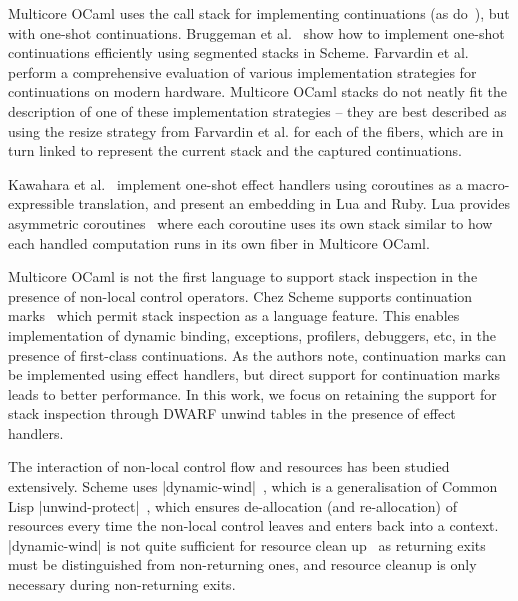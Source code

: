 \documentclass[sigplan,10pt,review,anonymous]{acmart}\settopmatter{printfolios=true,printccs=false,printacmref=false}
\begin{document}
Multicore OCaml uses the call stack for implementing continuations (as
do~\cite{Leijen14, Kiselyov12}), but with one-shot continuations. Bruggeman et
al.~\cite{Bruggeman96} show how to implement one-shot continuations efficiently
using segmented stacks in Scheme. Farvardin et al.~\cite{Farvardin20} perform a
comprehensive evaluation of various implementation strategies for continuations
on modern hardware. Multicore OCaml stacks do not neatly fit the description of
one of these implementation strategies -- they are best described as using the
resize strategy from Farvardin et al. for each of the fibers, which are in turn
linked to represent the current stack and the captured continuations.

Kawahara et al.~\cite{Kawahara20} implement one-shot effect handlers using
coroutines as a macro-expressible translation, and present an embedding in Lua
and Ruby. Lua provides asymmetric coroutines~\cite{Lua} where each coroutine
uses its own stack similar to how each handled computation runs in its own
fiber in Multicore OCaml.

Multicore OCaml is not the first language to support stack inspection in the
presence of non-local control operators. Chez Scheme supports continuation
marks~\cite{Flatt20} which permit stack inspection as a language feature. This
enables implementation of dynamic binding, exceptions, profilers, debuggers,
etc, in the presence of first-class continuations. As the authors note,
continuation marks can be implemented using effect handlers, but direct support
for continuation marks leads to better performance. In this work, we focus on
retaining the support for stack inspection through DWARF unwind tables in the
presence of effect handlers.

The interaction of non-local control flow and resources has been studied
extensively. Scheme uses |dynamic-wind|~\cite{R5RS}, which is a generalisation of
Common Lisp |unwind-protect|~\cite{Steele90}, which ensures de-allocation (and
re-allocation) of resources every time the non-local control leaves and enters
back into a context. |dynamic-wind| is not quite sufficient for resource
clean up~\cite{Kiselyov,Sitaram03} as returning exits must be distinguished
from non-returning ones, and resource cleanup is only necessary during
non-returning exits.
\end{document}
